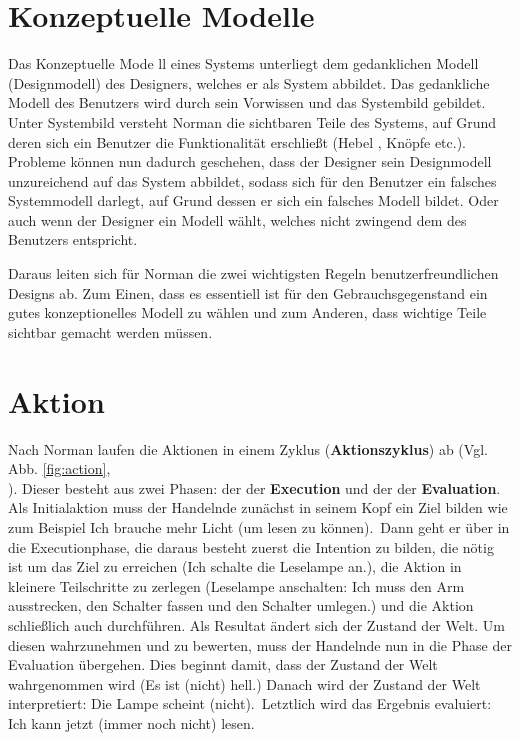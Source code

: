 \documentclass[parskip,headsepline, headtopline, %
footsepline, oneside, 12pt, headings=small]{scrreprt}
\begin{document}
\section{Konzeptuelle Modelle}

Das Konzeptuelle Mode l\cite[Vgl. S.13ff]{don}l eines Systems unterliegt dem gedanklichen Modell (Designmodell) des Designers, welches er als System abbildet. Das gedankliche Modell des Benutzers wird durch sein Vorwissen und das Systembild gebildet. Unter Systembild versteht Norman die sichtbaren Teile des Systems, auf Grund deren sich ein Benutzer die Funktionalität erschließt (Hebel , Knöpfe etc.). Probleme können nun dadurch geschehen, dass der Designer sein Designmodell unzureichend auf das System abbildet, sodass sich für den Benutzer ein falsches Systemmodell darlegt, auf Grund dessen er sich ein falsches Modell bildet. Oder auch wenn der Designer ein Modell wählt, welches nicht zwingend dem des Benutzers entspricht.

Daraus leiten sich für Norman die  zwei wichtigsten Regeln benutzerfreundlichen Designs ab. Zum Einen, dass es essentiell ist für den Gebrauchsgegenstand ein gutes konzeptionelles Modell zu wählen und zum Anderen, dass wichtige Teile sichtbar gemacht werden müssen.

\section{Aktion}

Nach Norman laufen die Aktionen in einem Zyklus (\textbf{Aktionszyklus}) ab (Vgl. Abb. \ref{fig:action},\\ \cite[S. 46ff]{don}). Dieser besteht aus zwei Phasen: der der \textbf{Execution} und der der \textbf{Evaluation}. Als Initialaktion muss der Handelnde zunächst in seinem Kopf ein Ziel bilden wie zum Beispiel \glqq Ich brauche mehr Licht (um lesen zu können).\grqq ~Dann geht er über in die Executionphase, die daraus besteht zuerst die Intention zu bilden, die nötig ist um das Ziel zu erreichen (\glqq Ich schalte die Leselampe an.\grqq), die Aktion in kleinere Teilschritte zu zerlegen (\glqq Leselampe anschalten: Ich muss den Arm ausstrecken, den Schalter fassen und den Schalter umlegen.\grqq) und die Aktion schließlich auch durchführen. Als Resultat ändert sich der Zustand der Welt. Um diesen wahrzunehmen und zu bewerten, muss der Handelnde nun in die Phase der Evaluation übergehen. Dies beginnt damit, dass der Zustand der Welt wahrgenommen wird (\glqq Es ist (nicht) hell.\grqq) Danach wird der Zustand der Welt interpretiert: \glqq Die Lampe scheint (nicht).\grqq~Letztlich wird das Ergebnis evaluiert: \glqq Ich kann jetzt (immer noch nicht) lesen.\grqq
\end{document}
